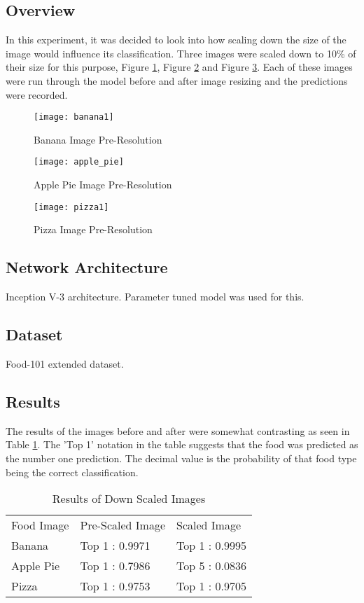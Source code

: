 \subsection*{Overview}
In this experiment, it was decided to look into how scaling down the size of the image would influence its classification. Three images were scaled down to 10\% of their size for this purpose, Figure \ref{fig:bananaPreRes}, Figure \ref{fig:apple_piePreRes} and Figure \ref{fig:pizzaPreRes}. Each of these images were run through the model before and after image resizing and the predictions were recorded.

\begin{figure}
    \texttt{[image: banana1]}
    \caption{Banana Image Pre-Resolution}
    \label{fig:bananaPreRes}
\end{figure}

\begin{figure}
    \texttt{[image: apple\_pie]}
    \caption{Apple Pie Image Pre-Resolution}
    \label{fig:apple_piePreRes}
\end{figure}

\begin{figure}
    \texttt{[image: pizza1]}
    \caption{Pizza Image Pre-Resolution}
    \label{fig:pizzaPreRes}
\end{figure}

\subsection*{Network Architecture}
Inception V-3 architecture. Parameter tuned model was used for this.

\subsection*{Dataset}
Food-101 extended dataset.

\subsection*{Results}
The results of the images before and after were somewhat contrasting as seen in Table \ref{scaledImages}. The 'Top 1' notation in the table suggests that the food was predicted as the number one prediction. The decimal value is the probability of that food type being the correct classification.

\begin{table}[]
\centering
\caption{Results of Down Scaled Images}
\label{scaledImages}
\begin{tabular}{lll}
Food Image & Pre-Scaled Image & Scaled Image   \\
Banana     & Top 1 : 0.9971   & Top 1 : 0.9995 \\
Apple Pie  & Top 1 : 0.7986   & Top 5 : 0.0836 \\
Pizza      & Top 1 : 0.9753   & Top 1 : 0.9705
\end{tabular}
\end{table}

